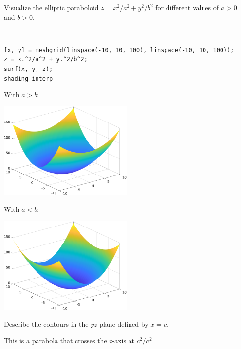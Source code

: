 Visualize the elliptic paraboloid $z = x^2/a^2 + y^2/b^2$ for different values of $a > 0$ and $b > 0$.

\begin{solution}\
\begin{lstlisting}
[x, y] = meshgrid(linspace(-10, 10, 100), linspace(-10, 10, 100));
z = x.^2/a^2 + y.^2/b^2;
surf(x, y, z);
shading interp
\end{lstlisting}

With $a > b$:
\begin{center}
    \includegraphics[width=0.5\textwidth]{img/e13p1a.png}
\end{center}

With $a < b$:
\begin{center}
    \includegraphics[width=0.5\textwidth]{img/e13p1b.png}
\end{center}
\end{solution}

Describe the contours in the $yz$-plane defined by $x = c$.

\begin{solution}
    This is a parabola that crosses the z-axis at $c^2/a^2$
\end{solution}